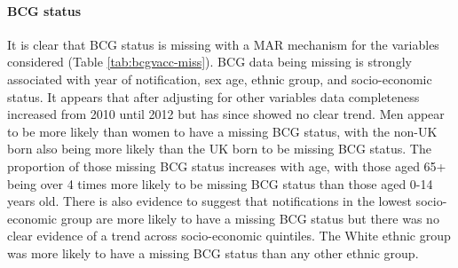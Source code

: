 \documentclass[11pt,twoside]{bristolthesis}
\begin{document}
  \hypertarget{bcg-status}{%
  \paragraph{BCG status}\label{bcg-status}}
  
  It is clear that BCG status is missing with a MAR mechanism for the variables considered (Table \ref{tab:bcgvacc-miss}). BCG data being missing is strongly associated with year of notification, sex age, ethnic group, and socio-economic status. It appears that after adjusting for other variables data completeness increased from 2010 until 2012 but has since showed no clear trend. Men appear to be more likely than women to have a missing BCG status, with the non-UK born also being more likely than the UK born to be missing BCG status. The proportion of those missing BCG status increases with age, with those aged 65+ being over 4 times more likely to be missing BCG status than those aged 0-14 years old. There is also evidence to suggest that notifications in the lowest socio-economic group are more likely to have a missing BCG status but there was no clear evidence of a trend across socio-economic quintiles. The White ethnic group was more likely to have a missing BCG status than any other ethnic group.
  
\end{document}
